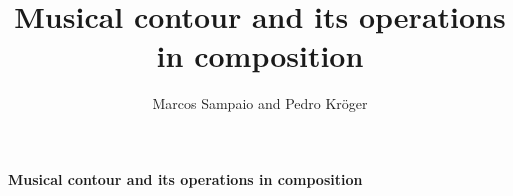 \documentclass[12pt]{article}
\begin{document}
\title{Musical contour and its operations in composition} 
\author{Marcos Sampaio and Pedro Kröger}

\begin{center}
  \Large \textbf{\textsf{Musical contour and its operations in composition}}
\end{center}


\thispagestyle{empty}

\doublespacing


\singlespacing



\end{document}
